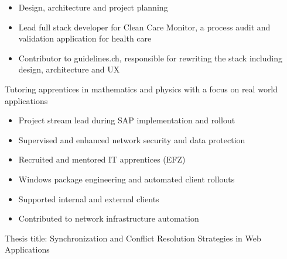\documentclass[10pt,a4paper]{altacv}
\begin{document}

\begin{fullwidth}
\makecvheader
\end{fullwidth}


\begin{itemize}
\item Design, architecture and project planning
\item Lead full stack developer for Clean Care Monitor, a process audit and validation application for health care
\item Contributor to guidelines.ch, responsible for rewriting the stack including design, architecture and UX
\end{itemize}
\divider

Tutoring apprentices in mathematics and physics with a focus on real world applications
\divider

\begin{itemize}
\item Project stream lead during SAP implementation and rollout
\item Supervised and enhanced network security and data protection
\item Recruited and mentored IT apprentices (EFZ)
\end{itemize}
\divider

\begin{itemize}
\item Windows package engineering and automated client rollouts
\item Supported internal and external clients
\item Contributed to network infrastructure automation
\end{itemize}


Thesis title: Synchronization and Conflict Resolution Strategies in Web Applications
\divider

\end{document}
